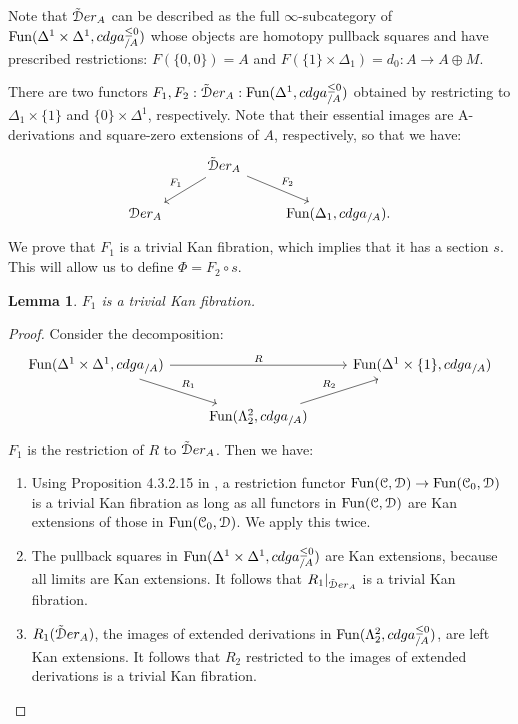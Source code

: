 \documentclass[10pt,a4paper,reqno,oneside]{book} %
\theoremstyle{plain}
\newtheorem{lem}[thm]{Lemma}
\theoremstyle{definition}
\theoremstyle{remark}
\numberwithin{equation}{section}
\begin{document}
Note that $\tilde {\mathcal D} er_A$ can be described as the full $\infty$-subcategory of $\operatorname{Fun}(\Delta^1 \times \Delta^1, cdga^{\leq 0}_{/A})$
whose objects are homotopy pullback squares and have prescribed restrictions: $F(\{0,0\}) = A$ and $F(\{1\}\times \Delta_1) = 
d_0 : A \to A\oplus M$.

There are two functors $F_1, F_2 : \tilde {\mathcal D} er_A : \operatorname{Fun}(\Delta^1, cdga^{\leq 0}_{/A})$ obtained by restricting to $\Delta_1 \times \{1\}$
and $\{0\} \times \Delta^1$, respectively. Note that their essential images are A-derivations and square-zero extensions of $A$,
respectively, so that we have:
\[
\begin{tikzcd}
\; & \tilde \cD er_A \arrow[swap]{ld}{F_1}\arrow{rd}{F_2} & \\
\cD er_A & & \Fun(\Delta_1, cdga_{/A}).
\end{tikzcd}
\]
We prove that $F_1$ is a trivial Kan fibration, which implies that it has a section $s$. This will allow us to define
$\Phi = F_2 \circ s$.

\begin{lem}
$F_1$ is a trivial Kan fibration.
\end{lem}
\begin{proof}
Consider the decomposition:
\[
\begin{tikzcd}
\Fun(\Delta^1 \times \Delta^1, cdga_{/A})\arrow{rr}{R}\arrow{rd}{R_1} & & \Fun(\Delta^1 \times \{1\}, cdga_{/A}) \\
& \Fun(\Lambda^2_2, cdga_{/A})\arrow{ur}{R_2} & 
\end{tikzcd}
\]
$F_1$ is the restriction of $R$ to $\tilde {\mathcal D} er_A$. Then we have:
\begin{enumerate}
\item Using Proposition 4.3.2.15 in \cite{HTT}, a restriction functor $\operatorname{Fun}(\mathcal C, \mathcal D) \to \operatorname{Fun}(\mathcal C_0, \mathcal D)$ is a trivial
Kan fibration as long as all functors in $\operatorname{Fun}(\mathcal C, \mathcal D)$ are Kan extensions of those in $\operatorname{Fun}(\mathcal C_0, \mathcal D)$. We apply this twice.
\item The pullback squares in $\operatorname{Fun}(\Delta^1 \times \Delta^1, cdga^{\leq 0}_{/A})$ are Kan extensions, because all limits are Kan
extensions. It follows that $R_1|_{\tilde {\mathcal D} er_A}$ is a trivial Kan fibration.
\item $R_1(\tilde {\mathcal D} er_A)$, the images of extended derivations in $\operatorname{Fun}(\Lambda^2_2, cdga^{\leq 0}_{/A})$, are left Kan extensions.
It follows that $R_2$ restricted to the images of extended derivations is a trivial Kan fibration.
\end{enumerate}
\end{proof}
\end{document}
